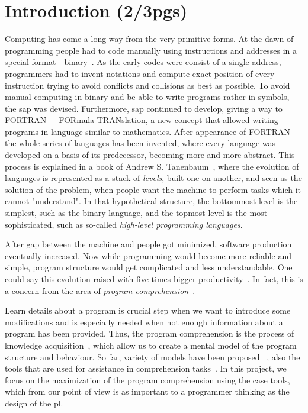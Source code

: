 
% 
% 

\section{Introduction (2/3pgs)}

Computing has come a long way from the very primitive forms. At the dawn of programming people had to code manually using instructions and addresses in a special format - binary~\cite{hamming2003art}. As the early codes were consist of a single address, programmers had to invent notations and compute exact position of every instruction trying to avoid conflicts and collisions as best as possible. To avoid manual computing in binary and be able to write programs rather in symbols, the \ac{sap} was devised. Furthermore, \ac{sap} continued to develop, giving a way to {\small FORTRAN}~\cite{backus1978history} - {\small FOR}mula {\small TRAN}slation, a new concept that allowed writing programs in language similar to mathematics. After appearance of {\small FORTRAN}~\cite{backus1978history} the whole series of languages has been invented, where every language was developed on a basis of its predecessor, becoming more and more abstract. This process is explained in a book of Andrew S. Tanenbaum~\cite{TanenbaumAustin201208}, where the evolution of languages is represented as a stack of \textit{levels}, built one on another, and seen as the solution of the problem, when people want the machine to perform tasks which it cannot "understand". In that hypothetical structure, the bottommost level is the simplest, such as the binary language, and the topmost level is the most sophisticated, such as so-called \textit{high-level programming languages}.

After gap between the machine and people got minimized, software production eventually increased. Now while programming would become more reliable and simple, program structure would get complicated and less understandable. One could say this evolution raised with five times bigger productivity~\cite{bullet1987essence}. In fact, this is a concern from the area of \textit{program comprehension}~\cite{rugaber1995program}.

Learn details about a program is crucial step when we want to introduce some modifications and is especially needed when not enough information about a program has been provided. Thus, the program comprehension is the process of knowledge acquisition~\cite{rugaber1995program}, which allow us to create a mental model of the program structure and behaviour. So far, variety of models have been proposed ~\cite{brooks1977towards,soloway1984empirical}, also the tools that are used for assistance in comprehension tasks~\cite{storey2005theories}. In this project, we focus on the maximization of the program comprehension using the \ac{case} tools, which from our point of view is as important to a programmer thinking as the design of the \ac{pl}. 

